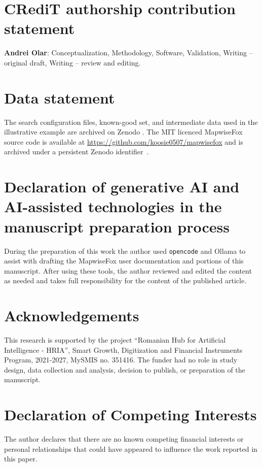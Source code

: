 \documentclass[preprint,12pt, a4paper]{elsarticle}
\begin{document}
\section*{CRediT authorship contribution statement}
\textbf{Andrei Olar}: Conceptualization, Methodology, Software,
Validation, Writing -- original draft, Writing -- review and editing.

\section*{Data statement}
The search configuration files, known-good set, and intermediate
data used in the illustrative example are archived on Zenodo
\cite{olar2026-config-examples}. The MIT licenced MapwiseFox source code
is available at \url{https://github.com/koosie0507/mapwisefox} and is archived
under a persistent Zenodo identifier~\cite{olar2026}.

\section*{Declaration of generative AI and AI-assisted technologies
in the manuscript preparation process}
During the preparation of this work the author used \texttt{opencode} and
Ollama to assist with drafting the MapwiseFox user documentation and portions of
this manuscript. After using these tools, the author reviewed and edited the
content as needed and takes full responsibility for the content of the
published article.

\section*{Acknowledgements}\label{sec:acknowledgements}

This research is supported by the project ``Romanian Hub for Artificial Intelligence -
HRIA'', Smart Growth, Digitization and Financial Instruments Program, 2021-2027, MySMIS
no. 351416. The funder had no role in study design, data collection and analysis,
decision to publish, or preparation of the manuscript.

\section*{Declaration of Competing Interests}\label{sec:conflicts}

The author declares that there are no known competing financial interests or personal
relationships that could have appeared to influence the work reported in this paper.
\end{document}
